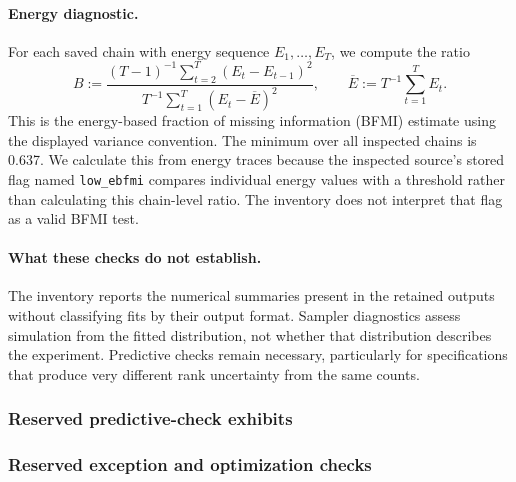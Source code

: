 \paragraph{Energy diagnostic.}
For each saved chain with energy sequence $E_1,\ldots,E_T$, we compute the
ratio
\[
B:=\frac{(T-1)^{-1}\sum_{t=2}^T(E_t-E_{t-1})^2}
{T^{-1}\sum_{t=1}^T(E_t-\overline E)^2},
\qquad \overline E:=T^{-1}\sum_{t=1}^T E_t.
\]
This is the energy-based fraction of missing information (BFMI) estimate
using the displayed variance convention. The minimum over all inspected
chains is 0.637. We calculate this from energy traces because the inspected
source's stored flag named \texttt{low\_ebfmi} compares individual energy
values with a threshold rather than calculating this chain-level ratio.
The inventory does not interpret that flag as a valid BFMI test.

\paragraph{What these checks do not establish.}
The inventory reports the numerical summaries present in the retained
outputs without classifying fits by their output format. Sampler diagnostics assess simulation
from the fitted distribution, not whether that distribution describes the
experiment. Predictive checks remain necessary, particularly for specifications
that produce very different rank uncertainty from the same counts.

\subsubsection{Reserved predictive-check exhibits}

\subsubsection{Reserved exception and optimization checks}

